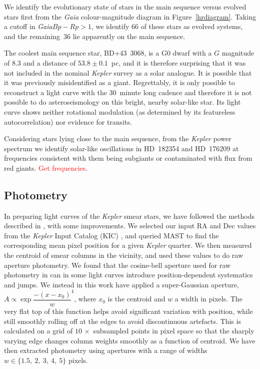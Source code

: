 \documentclass[a4paper,fleqn,usenatbib]{mnras}
\newcommand{\kepler}{\emph{Kepler}\xspace}
\newcommand{\gaia}{\emph{Gaia}\xspace}
\begin{document}
We identify the evolutionary state of stars in the main sequence versus evolved stars first from the \gaia colour-magnitude diagram in Figure~\ref{hrdiagram}. Taking a cutoff in \gaia $Bp-Rp > 1$, we identify 66 of these stars as evolved systems, and the remaining~36 lie apparently on the main sequence. 

The coolest main sequence star, BD+43~3068, is a G0 dwarf with a $G$ magnitude of 8.3 and a distance of $53.8 \pm 0.1$~pc, and it is therefore surprising that it was not included in the nominal \kepler survey as a solar analogue. It is possible that it was previously misidentified as a giant. Regrettably, it is only possible to reconstruct a light curve with the 30~minute long cadence and therefore it is not possible to do asteroseismology on this bright, nearby solar-like star. Its light curve shows neither rotational modulation (as determined by its featureless autocorrelation) nor evidence for transits.

Considering stars lying close to the main sequence, from the \kepler power spectrum we identify solar-like oscillations in HD~182354 and HD~176209 at frequencies consistent with them being subgiants or contaminated with flux from red giants. \textcolor{red}{Get frequencies}.

\subsection{Photometry}
\label{photometry}

In preparing light curves of the \kepler smear stars, we have followed the methods described in \citet{smear}, with some improvements. We selected our input RA and Dec values from the \kepler Input Catalog (KIC) \citep{kic}, and queried MAST to find the corresponding mean pixel position for a given \kepler quarter. We then measured the centroid of smear columns in the vicinity, and used these values to do raw aperture photometry. We found that the cosine-bell aperture used for raw photometry in \citet{smear} can in some light curves introduce position-dependent systematics and jumps. We instead in this work have applied a super-Gaussian aperture, $A \propto \exp{\dfrac{-(x-x_0)}{w} ^ 4}$, where $x_0$ is the centroid and $w$ a width in pixels. The very flat top of this function helps avoid significant variation with position, while still smoothly rolling off at the edges to avoid discontinuous artefacts. This is calculated on a grid of $10\,\times$ subsampled points in pixel space so that the sharply varying edge changes column weights smoothly as a function of centroid. We have then extracted photometry using apertures with a range of widths $w \in\{1.5,~2,~3,~4,~5\}$ pixels.
\end{document}
